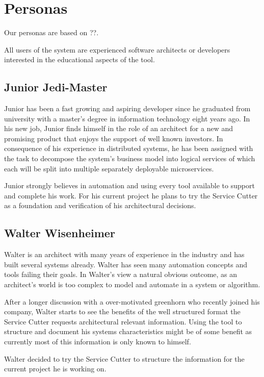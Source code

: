 
\section{Personas}

Our personas are based on ??. %

All users of the system are experienced software architects or developers interested in the educational aspects of the tool.

\subsection{Junior Jedi-Master}

Junior has been a fast growing and aspiring developer since he graduated from university with a master's degree in information technology eight years ago. In his new job, Junior finds himself in the role of an architect for a new and promising product that enjoys the support of well known investors. In consequence of his experience in distributed systems, he has been assigned with the task to decompose the system's business model into logical services of which each will be split into multiple separately deployable microservices. 

Junior strongly believes in automation and using every tool available to support and complete his work. For his current project he plans to try the Service Cutter as a foundation and verification of his architectural decisions. 


\subsection{Walter Wisenheimer}

Walter is an architect with many years of experience in the industry and has built several systems already. Walter has seen many automation concepts and tools failing their goals. In Walter's view a natural obvious outcome, as an architect's world is too complex to model and automate in a system or algorithm. 

After a longer discussion with a over-motivated greenhorn who recently joined his company, Walter starts to see the benefits of the well structured format the Service Cutter requests architectural relevant information. Using the tool to structure and document his systems characteristics might be of some benefit as currently most of this information is only known to himself. 

Walter decided to try the Service Cutter to structure the information for the current project he is working on.

